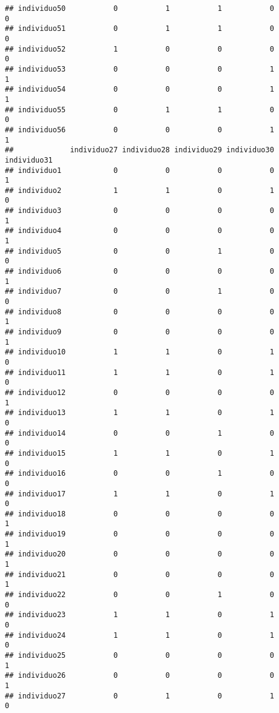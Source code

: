 \documentclass[
]{article}
\begin{document}
\begin{verbatim}
## individuo50           0           1           1           0           0
## individuo51           0           1           1           0           0
## individuo52           1           0           0           0           0
## individuo53           0           0           0           1           1
## individuo54           0           0           0           1           1
## individuo55           0           1           1           0           0
## individuo56           0           0           0           1           1
##             individuo27 individuo28 individuo29 individuo30 individuo31
## individuo1            0           0           0           0           1
## individuo2            1           1           0           1           0
## individuo3            0           0           0           0           1
## individuo4            0           0           0           0           1
## individuo5            0           0           1           0           0
## individuo6            0           0           0           0           1
## individuo7            0           0           1           0           0
## individuo8            0           0           0           0           1
## individuo9            0           0           0           0           1
## individuo10           1           1           0           1           0
## individuo11           1           1           0           1           0
## individuo12           0           0           0           0           1
## individuo13           1           1           0           1           0
## individuo14           0           0           1           0           0
## individuo15           1           1           0           1           0
## individuo16           0           0           1           0           0
## individuo17           1           1           0           1           0
## individuo18           0           0           0           0           1
## individuo19           0           0           0           0           1
## individuo20           0           0           0           0           1
## individuo21           0           0           0           0           1
## individuo22           0           0           1           0           0
## individuo23           1           1           0           1           0
## individuo24           1           1           0           1           0
## individuo25           0           0           0           0           1
## individuo26           0           0           0           0           1
## individuo27           0           1           0           1           0

\end{verbatim}
\end{document}

